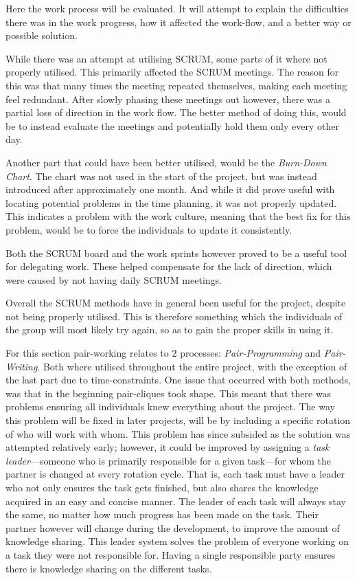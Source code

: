 Here the work process will be evaluated.
It will attempt to explain the difficulties there was in the work progress, how it affected the work-flow, and a better way or possible solution.

While there was an attempt at utilising SCRUM, some parts of it where not properly utilised.
This primarily affected the SCRUM meetings.
The reason for this was that many times the meeting repeated themselves, making each meeting feel redundant.
After slowly phasing these meetings out however, there was a partial loss of direction in the work flow.
The better method of doing this, would be to instead evaluate the meetings and potentially hold them only every other day.

Another part that could have been better utilised, would be the \textit{Burn-Down Chart}.
The chart was not used in the start of the project, but was instead introduced after approximately one month.
And while it did prove useful with locating potential problems in the time planning, it was not properly updated.
This indicates a problem with the work culture, meaning that the best fix for this problem, would be to force the individuals to update it consistently.

Both the SCRUM board and the work sprints however proved to be a useful tool for delegating work.
These helped compensate for the lack of direction, which were caused by not having daily SCRUM meetings.

Overall the SCRUM methods have in general been useful for the project, despite not being properly utilised.
This is therefore something which the individuals of the group will most likely try again, so as to gain the proper skills in using it.

For this section pair-working relates to 2 processes: \textit{Pair-Programming} and \textit{Pair-Writing}.
Both where utilised throughout the entire project, with the exception of the last part due to time-constraints.
One issue that occurred with both methods, was that in the beginning pair-cliques took shape.
This meant that there was problems ensuring all individuals knew everything about the project.
The way this problem will be fixed in later projects, will be by including a specific rotation of who will work with whom.
This problem has since subsided as the solution was attempted relatively early; however, it could be improved by assigning a \textit{task leader}---someone who is primarily responsible for a given task---for whom the partner is changed at every rotation cycle. 
That is, each task must have a leader who not only ensures the task gets finished, but also shares the knowledge acquired in an easy and concise manner.
The leader of each task will always stay the same, no matter how much progress has been made on the task.
Their partner however will change during the development, to improve the amount of knowledge sharing.
This leader system solves the problem of everyone working on a task they were not responsible for.
Having a single responsible party ensures there is knowledge sharing on the different tasks.


